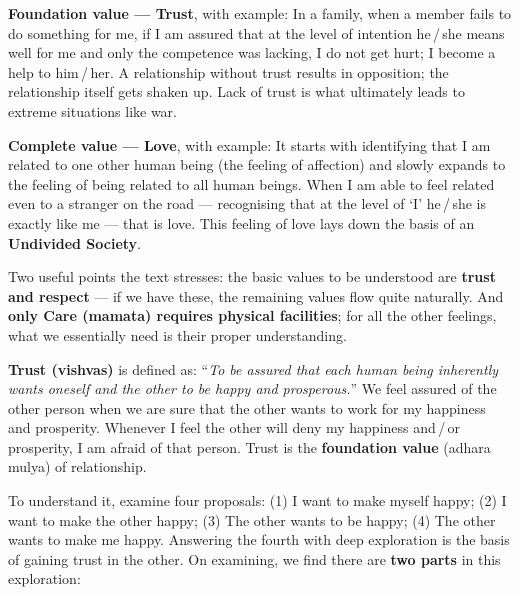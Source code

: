 \textbf{Foundation value --- Trust}, with example: In a family, when a member
fails to do something for me, if I am assured that at the level of intention
he\,/\,she means well for me and only the competence was lacking, I do not get
hurt; I become a help to him\,/\,her. A relationship without trust results in
opposition; the relationship itself gets shaken up. Lack of trust is what
ultimately leads to extreme situations like war.

\textbf{Complete value --- Love}, with example: It starts with identifying
that I am related to one other human being (the feeling of affection) and
slowly expands to the feeling of being related to all human beings. When I am
able to feel related even to a stranger on the road --- recognising that at
the level of `I' he\,/\,she is exactly like me --- that is love. This feeling
of love lays down the basis of an \textbf{Undivided Society}.

Two useful points the text stresses: the basic values to be understood are
\textbf{trust and respect} --- if we have these, the remaining values flow
quite naturally. And \textbf{only Care (mamata) requires physical facilities};
for all the other feelings, what we essentially need is their proper
understanding.

%
  {}

\ans \textbf{Trust (vishvas)} is defined as: ``\emph{To be assured that each
human being inherently wants oneself and the other to be happy and
prosperous.}'' We feel assured of the other person when we are sure that the
other wants to work for my happiness and prosperity. Whenever I feel the other
will deny my happiness and\,/\,or prosperity, I am afraid of that person.
Trust is the \textbf{foundation value} (adhara mulya) of relationship.

To understand it, examine four proposals: (1) I want to make myself happy;
(2) I want to make the other happy; (3) The other wants to be happy; (4) The
other wants to make me happy. Answering the fourth with deep exploration is
the basis of gaining trust in the other. On examining, we find there are
\textbf{two parts} in this exploration:

